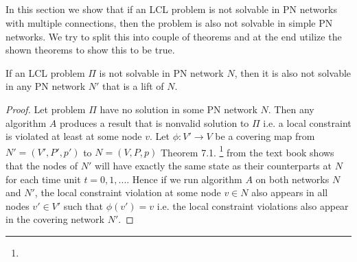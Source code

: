 
\subsection{}
In this section we show that if an LCL problem is not solvable in PN networks with multiple connections, then the problem is also not solvable in simple PN networks.
We try to split this into couple of theorems and at the end utilize the shown theorems to show this to be true.

\begin{theorem} \label{thm:lcl_nonsolvability:2}
If an LCL problem $\Pi$ is not solvable in PN network $N$, then it is also not solvable in any PN network $N'$ that is a lift of $N$.
\end{theorem}
\begin{proof}
    Let problem $\Pi$ have no solution in some PN network $N$.
    Then any algorithm $A$ produces a result that is nonvalid solution to $\Pi$ i.e. a local constraint is violated at least at some node $v$.
    Let $\phi: V' \rightarrow V$ be a covering map from $N'=(V', P', p')$ to $N=(V, P, p)$
    Theorem 7.1. \footnote{} from the text book \cite{HirvonenSuomelaDistAlg2020} shows that the nodes of $N'$ will have exactly the same state as their counterparts at $N$ for each time unit $t=0,1,...$.
    Hence if we run algorithm $A$ on both networks $N$ and $N'$, the local constraint violation at some node $v \in N$ also appears in all nodes $v' \in V'$ such that $\phi(v') = v$ i.e. the local constraint violations also appear in the covering network $N'$.
\end{proof}

